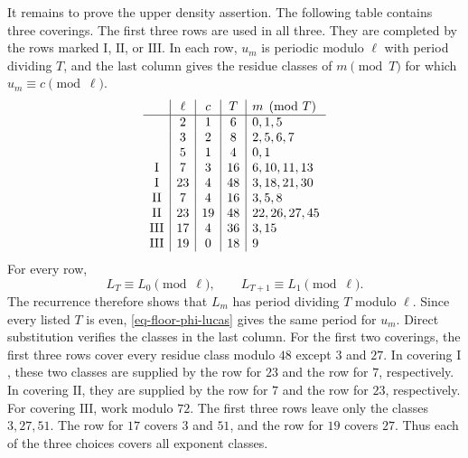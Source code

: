 \documentclass[11pt,reqno]{amsart}
\numberwithin{equation}{section}
\begin{document}
    It remains to prove the upper density assertion. The following table contains three coverings. The first three rows are used in all three. They are completed by the rows marked $\mathrm{I}$, $\mathrm{II}$, or $\mathrm{III}$. In each row, $u_m$ is periodic modulo $\ell$ with period dividing $T$, and the last column gives the residue classes of $m\pmod T$ for which $u_m\equiv c\pmod\ell$.
    $$
    \begin{array}{c|c|c|c|l}
        & \ell & c & T & m\pmod T \\
        \hline
        & 2  & 1  & 6  & 0,1,5\\
        & 3  & 2  & 8  & 2,5,6,7\\
        & 5  & 1  & 4  & 0,1\\
        \mathrm{I}  & 7  & 3  & 16 & 6,10,11,13\\
        \mathrm{I}  & 23 & 4  & 48 & 3,18,21,30\\
        \mathrm{II} & 7  & 4  & 16 & 3,5,8\\
        \mathrm{II} & 23 & 19 & 48 & 22,26,27,45\\
        \mathrm{III}& 17 & 4  & 36 & 3,15\\
        \mathrm{III}& 19 & 0  & 18 & 9
    \end{array}
    $$
    For every row,
    $$
    L_T\equiv L_0\pmod\ell,
    \qquad
    L_{T+1}\equiv L_1\pmod\ell.
    $$
    The recurrence therefore shows that $L_m$ has period dividing $T$ modulo $\ell$. Since every listed $T$ is even, \eqref{eq-floor-phi-lucas} gives the same period for $u_m$. Direct substitution verifies the classes in the last column. For the first two coverings, the first three rows cover every residue class modulo $48$ except $3$ and $27$. In covering $\mathrm{I}$, these two classes are supplied by the row for $23$ and the row for $7$, respectively. In covering $\mathrm{II}$, they are supplied by the row for $7$ and the row for $23$, respectively. For covering $\mathrm{III}$, work modulo $72$. The first three rows leave only the classes $3,27,51$. The row for $17$ covers $3$ and $51$, and the row for $19$ covers $27$. Thus each of the three choices covers all exponent classes.
\end{document}
